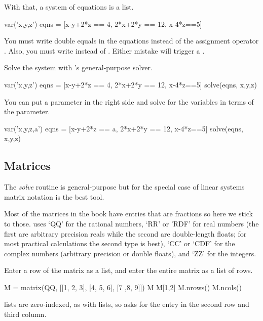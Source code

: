 With that, a system of equations is a list.
\begin{sageoutput}
var('x,y,z')                                  
eqns = [x-y+2*z == 4, 2*x+2*y == 12, x-4*z==5]
\end{sageoutput}
\noindent
You must write double equals \inlinecode{==} in the equations instead of 
the assignment operator \inlinecode{=}.
Also, you must write 
instead of .
Either mistake will trigger a  
.

Solve the system with \Sage's general-purpose solver.
\begin{sageoutput}[d,0,2]
var('x,y,z')                                  
eqns = [x-y+2*z == 4, 2*x+2*y == 12, x-4*z==5]
solve(eqns, x,y,z)                            
\end{sageoutput}

You can put a parameter in the right side and solve for the variables
in terms of the parameter.
\begin{sageoutput}
var('x,y,z,a')                                
eqns = [x-y+2*z == a, 2*x+2*y == 12, x-4*z==5]
solve(eqns, x,y,z) 
\end{sageoutput}



\subsection{Matrices}
The \textit{solve} routine is general-purpose but 
for the special case of linear systems matrix notation is the best tool.
 
Most of the matrices in the book
have entries that are fractions so here we stick
to those.
\Sage{} uses `QQ' for the rational numbers,
`RR' or 'RDF' for real numbers (the first are arbitrary precision reals while
the second are double-length floats; for most practical calculations the 
second type is best),
`CC'  or `CDF' for the complex numbers (arbitrary precision or double floats),
and
`ZZ' for the integers.

Enter a row of the matrix as a list, and
enter the entire matrix as a list of rows.
\begin{sageoutput}
M = matrix(QQ, [[1, 2, 3], [4, 5, 6], [7 ,8, 9]])
M
M[1,2]
M.nrows()
M.ncols()
\end{sageoutput}
\noindent
\Sage{} lists are zero-indexed, as with \python{} lists, 
so  asks
for the entry in the second row and third column. 

